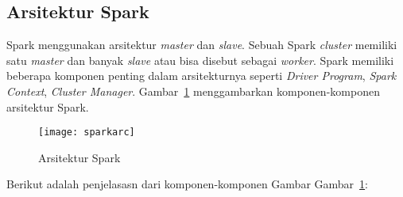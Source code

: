 \subsection{Arsitektur Spark}

Spark menggunakan arsitektur \textit{master} dan \textit{slave}. Sebuah Spark \textit{cluster} memiliki satu \textit{master} dan banyak \textit{slave} atau bisa disebut sebagai \textit{worker}. Spark memiliki beberapa komponen penting dalam arsitekturnya seperti \textit{Driver Program}, \textit{Spark Context}, \textit{Cluster Manager}. Gambar~\ref{fig:sparkarc} menggambarkan komponen-komponen arsitektur Spark.


\begin{figure}[H]
    \centering  
    \texttt{[image: sparkarc]}  
    \caption[Arsitektur Spark]{Arsitektur Spark} 
    \label{fig:sparkarc} 
\end{figure}

Berikut adalah penjelasasn dari komponen-komponen Gambar Gambar~\ref{fig:sparkarc}:

